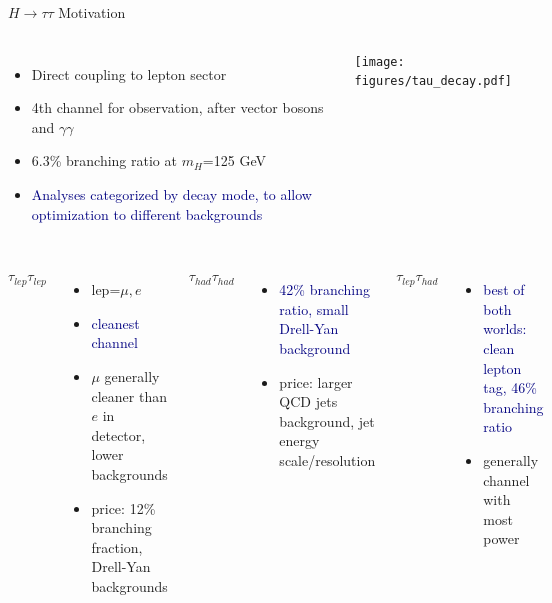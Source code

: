 \documentclass{beamer}
\begin{document}
\begin{frame}{$H\rightarrow \tau \tau$ Motivation}
	\begin{columns}[c]
	\begin{itemize} \scriptsize

		\item \textcolor{BrickRed}{Direct coupling to lepton sector}
		\item 4th channel for observation, after vector bosons and $\gamma \gamma$
		\item \textcolor{BrickRed}{6.3\% branching ratio at $m_H$=125 GeV}
		\item \textcolor{Navy}{Analyses categorized by decay mode, to allow optimization to different backgrounds}

	\end{itemize}
		\texttt{[image: figures/tau\_decay.pdf]}
	\end{columns}
	
	\vspace{1cm}

	\begin{columns}
			$\tau_{lep}\tau_{lep}$
			\begin{itemize} \scriptsize
				\item lep=$\mu, e$
				\item \textcolor{Navy}{cleanest channel}
				\item $\mu$ generally cleaner than $e$ in detector, lower backgrounds
				\item \textcolor{BrickRed}{price: 12\% branching fraction, Drell-Yan backgrounds}
			\end{itemize}

			$\tau_{had}\tau_{had}$
			\begin{itemize} \scriptsize
				\item \textcolor{Navy}{42\% branching ratio, small Drell-Yan background}
				\item \textcolor{BrickRed}{price: larger QCD jets background, jet energy scale/resolution}
			\end{itemize}


			$\tau_{lep}\tau_{had}$

				\begin{itemize}	\scriptsize		
					\item \textcolor{Navy}{best of both worlds: clean lepton tag, 46\% branching ratio}
					\item \textcolor{BrickRed}{generally channel with most power}
				\end{itemize}
	\end{columns}
\end{frame}
\end{document}
